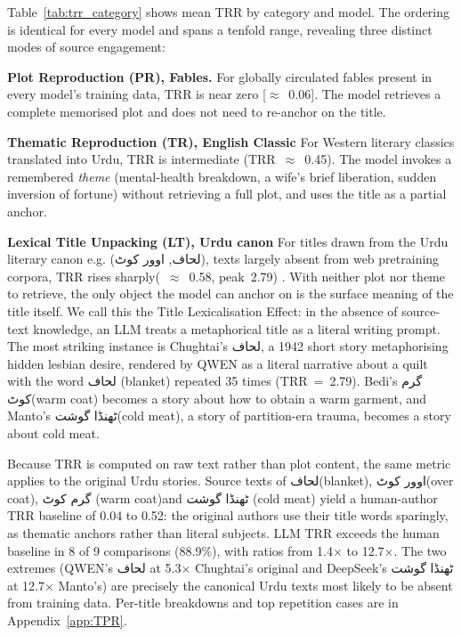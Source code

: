 \documentclass[11pt]{article}
\begin{document}
Table~\ref{tab:trr_category} shows mean TRR by category
and model. The ordering is identical for every model and
spans a tenfold range, revealing three distinct modes of
source engagement:

\textbf{Plot Reproduction (PR), Fables.}
    For globally circulated fables present in every
    model's training data, TRR is near zero [$\approx$~0.06]. The
    model retrieves a complete memorised plot and does not
    need to re-anchor on the title.
    
\textbf{Thematic Reproduction (TR), English Classic }
    For Western literary classics translated into Urdu, TRR is
    intermediate (TRR~$\approx$~0.45). The model invokes a remembered
    \emph{theme} (mental-health breakdown, a wife's brief
    liberation, sudden inversion of fortune) without
    retrieving a full plot, and uses the title as a
    partial anchor.
    
\textbf{Lexical Title Unpacking (LT), Urdu canon}
    For titles drawn from the Urdu literary canon e.g. 
    (\foreignlanguage{arabic}{لحاف},
    \foreignlanguage{arabic}{اوور کوٹ}), texts largely
    absent from web pretraining corpora, TRR rises
    sharply(~$\approx$~0.58, peak~2.79) . With neither plot nor theme to retrieve, the
    only object the model can anchor on is the surface
    meaning of the title itself.
We call this the Title Lexicalisation Effect: in
the absence of source-text knowledge, an LLM treats a
metaphorical title as a literal writing prompt. The most
striking instance is Chughtai's
\foreignlanguage{arabic}{لحاف}, a 1942 short story
metaphorising hidden lesbian desire, rendered by QWEN as a
literal narrative about a quilt with the word
\foreignlanguage{arabic}{لحاف} (blanket) repeated 35 times
(TRR~=~2.79). Bedi's \foreignlanguage{arabic}{گرم کوٹ}(warm coat)
becomes a story about how to obtain a warm garment, and
Manto's \foreignlanguage{arabic}{ٹھنڈا گوشت}(cold meat), a story of
partition-era trauma, becomes a story about cold meat.

Because TRR is computed on raw text rather than plot
content, the same metric applies to the original Urdu
stories. Source texts of
\foreignlanguage{arabic}{لحاف}(blanket),
\foreignlanguage{arabic}{اوور کوٹ}(over coat),
\foreignlanguage{arabic}{گرم کوٹ} (warm coat)and
\foreignlanguage{arabic}{ٹھنڈا گوشت} (cold meat) 
yield a human-author TRR baseline of 0.04 to 0.52: the
original authors use their title words sparingly, as
thematic anchors rather than literal subjects. LLM TRR
exceeds the human baseline in 8 of 9 comparisons (88.9\%),
with ratios from 1.4$\times$ to 12.7$\times$. The two
extremes (QWEN's \foreignlanguage{arabic}{لحاف} at
5.3$\times$ Chughtai's original and DeepSeek's
\foreignlanguage{arabic}{ٹھنڈا گوشت} at 12.7$\times$
Manto's) are precisely the canonical Urdu texts most
likely to be absent from training data. Per-title
breakdowns and top repetition cases are in
Appendix~\ref{app:TPR}.
\end{document}
